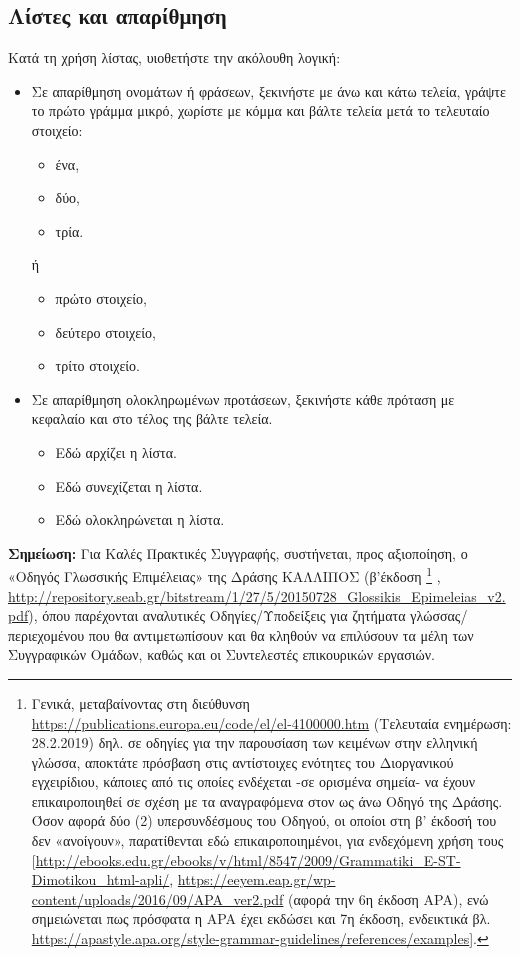\subsection{Λίστες και απαρίθμηση}
Κατά τη χρήση λίστας, υιοθετήστε την ακόλουθη λογική:
\begin{itemize}
\item Σε απαρίθμηση ονομάτων ή φράσεων, ξεκινήστε με άνω και κάτω τελεία, γράψτε το
πρώτο γράμμα μικρό, χωρίστε με κόμμα και βάλτε τελεία μετά το τελευταίο στοιχείο:
\begin{itemize}
\item ένα,
\item δύο,
\item τρία.
\end{itemize}

{ή}

\begin{itemize}
\item πρώτο στοιχείο,
\item δεύτερο στοιχείο,
\item τρίτο στοιχείο.
\end{itemize}
\item Σε απαρίθμηση ολοκληρωμένων προτάσεων, ξεκινήστε κάθε πρόταση με κεφαλαίο
και στο τέλος της βάλτε τελεία.
\begin{itemize}
\item Εδώ αρχίζει η λίστα.
\item Εδώ συνεχίζεται η λίστα.
\item Εδώ ολοκληρώνεται η λίστα.
\end{itemize}
\end{itemize}
\textbf{Σημείωση:} Για Καλές Πρακτικές Συγγραφής, συστήνεται, προς αξιοποίηση, ο «Οδηγός
Γλωσσικής Επιμέλειας» της Δράσης ΚΑΛΛΙΠΟΣ (β’έκδοση \footnote{Γενικά, μεταβαίνοντας στη διεύθυνση \url{https://publications.europa.eu/code/el/el-4100000.htm} (Τελευταία ενημέρωση: 28.2.2019) δηλ. σε οδηγίες για την παρουσίαση των κειμένων στην ελληνική γλώσσα, αποκτάτε πρόσβαση στις αντίστοιχες ενότητες του Διοργανικού εγχειρίδιου, κάποιες από τις οποίες ενδέχεται -σε ορισμένα σημεία- να έχουν επικαιροποιηθεί σε σχέση με τα αναγραφόμενα στον ως άνω Οδηγό της Δράσης. Όσον αφορά δύο (2) υπερσυνδέσμους του Οδηγού, οι οποίοι στη β’ έκδοσή του δεν «ανοίγουν», παρατίθενται εδώ επικαιροποιημένοι, για ενδεχόμενη χρήση τους
[\url{http://ebooks.edu.gr/ebooks/v/html/8547/2009/Grammatiki\_E-ST-Dimotikou\_html-apli/},
\url{https://eeyem.eap.gr/wp-content/uploads/2016/09/APA\_ver2.pdf} (αφορά την 6η έκδοση APA), ενώ
σημειώνεται πως πρόσφατα η APA έχει εκδώσει και 7η έκδοση, ενδεικτικά
βλ. \url{https://apastyle.apa.org/style-grammar-guidelines/references/examples}].} ,
\url{http://repository.seab.gr/bitstream/1/27/5/20150728\_Glossikis\_Epimeleias\_v2.pdf}), όπου
παρέχονται αναλυτικές Οδηγίες/Υποδείξεις για ζητήματα γλώσσας/περιεχομένου που θα
αντιμετωπίσουν και θα κληθούν να επιλύσουν τα μέλη των Συγγραφικών Ομάδων, καθώς
και οι Συντελεστές επικουρικών εργασιών.
